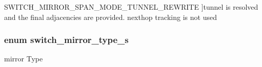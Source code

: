 \begin{Desc}
\begin{description}
{\hypertarget{group__Mirror_gga2079fb7f359b736e7452ee4ef9064414a3228a5d25c1d26a143382818f730614a}{S\+W\+I\+T\+C\+H\+\_\+\+M\+I\+R\+R\+O\+R\+\_\+\+S\+P\+A\+N\+\_\+\+M\+O\+D\+E\+\_\+\+T\+U\+N\+N\+E\+L\+\_\+\+R\+E\+W\+R\+I\+T\+E}\label{group__Mirror_gga2079fb7f359b736e7452ee4ef9064414a3228a5d25c1d26a143382818f730614a}
}]tunnel is resolved and the final adjacencies are provided. nexthop tracking is not used \end{description}
\end{Desc}
\hypertarget{group__Mirror_ga58d4e2d8a2e2b8efebe22d1adbdd0f2e}{
\subsubsection[{switch\+\_\+mirror\+\_\+type\+\_\+s}]{\setlength{\rightskip}{0pt plus 5cm}enum {\bf switch\+\_\+mirror\+\_\+type\+\_\+s}}}\label{group__Mirror_ga58d4e2d8a2e2b8efebe22d1adbdd0f2e}
mirror Type 

